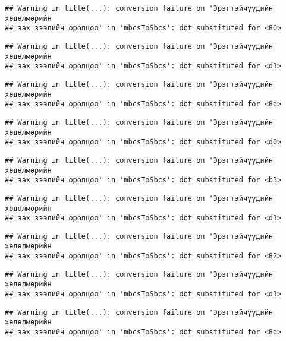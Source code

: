 \documentclass[]{article}
\begin{document}
\begin{verbatim}
## Warning in title(...): conversion failure on 'Эрэгтэйчүүдийн хөдөлмөрийн
## зах зээлийн оролцоо' in 'mbcsToSbcs': dot substituted for <80>
\end{verbatim}

\begin{verbatim}
## Warning in title(...): conversion failure on 'Эрэгтэйчүүдийн хөдөлмөрийн
## зах зээлийн оролцоо' in 'mbcsToSbcs': dot substituted for <d1>
\end{verbatim}

\begin{verbatim}
## Warning in title(...): conversion failure on 'Эрэгтэйчүүдийн хөдөлмөрийн
## зах зээлийн оролцоо' in 'mbcsToSbcs': dot substituted for <8d>
\end{verbatim}

\begin{verbatim}
## Warning in title(...): conversion failure on 'Эрэгтэйчүүдийн хөдөлмөрийн
## зах зээлийн оролцоо' in 'mbcsToSbcs': dot substituted for <d0>
\end{verbatim}

\begin{verbatim}
## Warning in title(...): conversion failure on 'Эрэгтэйчүүдийн хөдөлмөрийн
## зах зээлийн оролцоо' in 'mbcsToSbcs': dot substituted for <b3>
\end{verbatim}

\begin{verbatim}
## Warning in title(...): conversion failure on 'Эрэгтэйчүүдийн хөдөлмөрийн
## зах зээлийн оролцоо' in 'mbcsToSbcs': dot substituted for <d1>
\end{verbatim}

\begin{verbatim}
## Warning in title(...): conversion failure on 'Эрэгтэйчүүдийн хөдөлмөрийн
## зах зээлийн оролцоо' in 'mbcsToSbcs': dot substituted for <82>
\end{verbatim}

\begin{verbatim}
## Warning in title(...): conversion failure on 'Эрэгтэйчүүдийн хөдөлмөрийн
## зах зээлийн оролцоо' in 'mbcsToSbcs': dot substituted for <d1>
\end{verbatim}

\begin{verbatim}
## Warning in title(...): conversion failure on 'Эрэгтэйчүүдийн хөдөлмөрийн
## зах зээлийн оролцоо' in 'mbcsToSbcs': dot substituted for <8d>
\end{verbatim}
\end{document}
